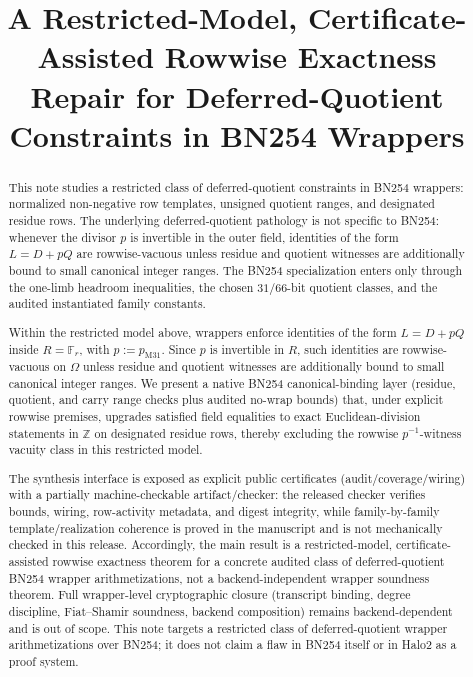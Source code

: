 ﻿\documentclass[11pt]{article}
\title{A Restricted-Model, Certificate-Assisted Rowwise Exactness Repair for Deferred-Quotient Constraints in BN254 Wrappers}
\author{}
\date{}
\newcommand{\F}{\mathbb{F}}
\newcommand{\Z}{\mathbb{Z}}
\begin{document}
\maketitle

\begin{abstract}
This note studies a restricted class of deferred-quotient constraints in BN254
wrappers: normalized non-negative row templates, unsigned quotient ranges, and
designated residue rows. The underlying deferred-quotient pathology is not
specific to BN254: whenever the divisor \(p\) is invertible in the outer field,
identities of the form \(L=D+pQ\) are rowwise-vacuous unless residue and
quotient witnesses are additionally bound to small canonical integer ranges.
The BN254 specialization enters only through the one-limb headroom inequalities,
the chosen \(31/66\)-bit quotient classes, and the audited instantiated family
constants.

Within the restricted model above, wrappers enforce identities of the form
\(L=D+pQ\) inside \(R=\F_r\), with \(p:=p_{\mathrm{M31}}\). Since \(p\) is
invertible in \(R\), such identities are rowwise-vacuous on \(\Omega\) unless
residue and quotient witnesses are additionally bound to small canonical
integer ranges. We present a native BN254 canonical-binding layer (residue,
quotient, and carry range checks plus audited no-wrap bounds) that, under
explicit rowwise premises, upgrades satisfied field equalities to exact
Euclidean-division statements in \(\Z\) on designated residue rows, thereby
excluding the rowwise \(p^{-1}\)-witness vacuity class in this restricted
model.

The synthesis interface is exposed as explicit public certificates
(audit/coverage/wiring) with a partially machine-checkable artifact/checker:
the released checker verifies bounds, wiring, row-activity metadata, and digest
integrity, while family-by-family template/realization coherence is proved in
the manuscript and is not mechanically checked in this release. Accordingly,
the main result is a restricted-model, certificate-assisted rowwise exactness
theorem for a concrete audited class of deferred-quotient BN254 wrapper
arithmetizations, not a backend-independent wrapper soundness theorem. Full
wrapper-level cryptographic closure (transcript binding, degree discipline,
Fiat--Shamir soundness, backend composition) remains backend-dependent and is
out of scope. This note targets a restricted class of deferred-quotient wrapper
arithmetizations over BN254; it does not claim a flaw in BN254 itself or in
Halo2 as a proof system.
\end{abstract}
\end{document}

